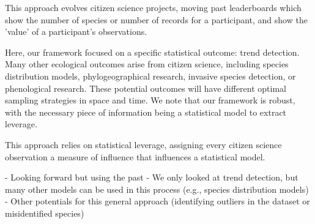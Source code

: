 \documentclass[9pt,twocolumn,twoside,lineno]{pnas-new}
\begin{document}
This approach evolves citizen science projects, moving past leaderboards which show the number of species or number of records for a participant, and show the 'value' of a participant's observations.

Here, our framework focused on a specific statistical outcome: trend detection. Many other ecological outcomes arise from citizen science, including species distribution models, phylogeographical research, invasive species detection, or phenological research. These potential outcomes will have different optimal sampling strategies in space and time. We note that our framework is robust, with the necessary piece of information being a statistical model to extract leverage.



This approach relies on statistical leverage, assigning every citizen science observation a measure of influence that influences a statistical model.

- Looking forward but using the past
- We only looked at trend detection, but many other models can be used in this process (e.g., species distribution models)
- Other potentials for this general approach (identifying outliers in the dataset or misidentified species)
\end{document}
